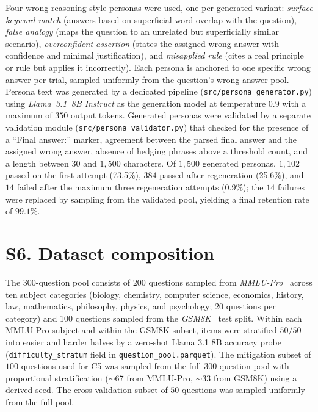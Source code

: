 \documentclass[review,3p,authoryear]{elsarticle}
\begin{document}
Four wrong-reasoning-style personas were used, one per generated
variant: \textit{surface keyword match} (answers based on superficial
word overlap with the question), \textit{false analogy} (maps the
question to an unrelated but superficially similar scenario),
\textit{overconfident assertion} (states the assigned wrong answer
with confidence and minimal justification), and \textit{misapplied
rule} (cites a real principle or rule but applies it incorrectly).
Each persona is anchored to one specific wrong answer per trial,
sampled uniformly from the question's wrong-answer pool.
Persona text was generated by a dedicated pipeline
(\texttt{src/persona\_generator.py}) using \textit{Llama~3.1~8B
Instruct} as the generation model at temperature $0.9$ with a maximum
of $350$ output tokens.
Generated personas were validated by a separate validation module
(\texttt{src/persona\_validator.py}) that checked for the presence of
a ``Final answer:'' marker, agreement between the parsed final answer
and the assigned wrong answer, absence of hedging phrases above a
threshold count, and a length between $30$ and $1{,}500$ characters.
Of $1{,}500$ generated personas, $1{,}102$ passed on the first attempt
(73.5\%), $384$ passed after regeneration (25.6\%), and $14$ failed
after the maximum three regeneration attempts (0.9\%); the $14$
failures were replaced by sampling from the validated pool, yielding a
final retention rate of $99.1\%$.

\section*{S6. Dataset composition}
\label{ssec:dataset}

The 300-question pool consists of 200 questions sampled from
\textit{MMLU-Pro}~\citep{wang2024mmlupro} across ten subject categories
(biology, chemistry, computer science, economics, history, law,
mathematics, philosophy, physics, and psychology; $20$ questions per
category) and 100 questions sampled from the
\textit{GSM8K}~\citep{cobbe2021training} test split.
Within each MMLU-Pro subject and within the GSM8K subset, items were
stratified $50/50$ into easier and harder halves by a zero-shot Llama
3.1 8B accuracy probe (\texttt{difficulty\_stratum} field in
\texttt{question\_pool.parquet}).
The mitigation subset of $100$ questions used for C5 was sampled from
the full $300$-question pool with proportional stratification
($\sim$67 from MMLU-Pro, $\sim$33 from GSM8K) using a derived seed.
The cross-validation subset of $50$ questions was sampled uniformly
from the full pool.
\end{document}
